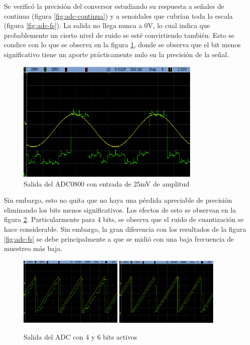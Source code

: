 \documentclass[assd_tp3_main.tex]{subfiles}
\begin{document}
Se verific\'o la precisi\'on del conversor estudiando su respuesta a se\~nales de continua (figura \ref{fig:adc-continua}) y a senoidales que cubr\'ian toda la escala (figura \ref{fig:adc-fs}). La salida no llega nunca a 0V, lo cual indica que probablemente un cierto nivel de ruido se est\'e convirtiendo tambi\'en. Esto se condice con lo que se observa en la figura \ref{fig:adc-chiquita}, donde se observa que el bit menos significativo tiene un aporte pr\'acticamente nulo en la precisi\'on de la se\~nal.


\begin{figure}[htb!]
	\centering
	\includegraphics[width=0.8\textwidth]
	{images/ej1/mediciones/a__.png}
	\caption{Salida del ADC0800 con entrada de 25mV de amplitud}
	\label{fig:adc-chiquita}
\end{figure}

Sin embargo, esto no quita que no haya una p\'erdida apreciable de precisi\'on eliminando los bits menos significativos. Los efectos de esto se observan en la figura \ref{fig:adc-bits}. Particularmente para 4 bits, se observa que el ruido de cuantizaci\'on se hace considerable. Sin embargo, la gran diferencia con los resultados de la figura \ref{fig:adc-fs} se debe principalmente a que se midi\'o con una baja frecuencia de muestreo m\'as baja.

\begin{figure}[htb!]
	\centering
	\includegraphics[width=0.45\textwidth]
	{images/ej1/mediciones/a_4.png}
	\includegraphics[width=0.45\textwidth]
	{images/ej1/mediciones/a_6.png}
	\caption{Salida del ADC con 4  y 6 bits activos}
	\label{fig:adc-bits}
\end{figure}
\end{document}
